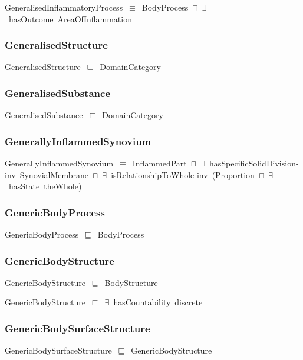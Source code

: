 \documentclass{article}
\begin{document}
GeneralisedInflammatoryProcess~\ensuremath{\equiv}~BodyProcess~\ensuremath{\sqcap}~\ensuremath{\exists}~hasOutcome~AreaOfInflammation

\subsubsection*{GeneralisedStructure}

GeneralisedStructure~\ensuremath{\sqsubseteq}~DomainCategory~

\subsubsection*{GeneralisedSubstance}

GeneralisedSubstance~\ensuremath{\sqsubseteq}~DomainCategory~

\subsubsection*{GenerallyInflammedSynovium}

GenerallyInflammedSynovium~\ensuremath{\equiv}~InflammedPart~\ensuremath{\sqcap}~\ensuremath{\exists}~hasSpecificSolidDivision-inv~SynovialMembrane~\ensuremath{\sqcap}~\ensuremath{\exists}~isRelationshipToWhole-inv~(Proportion~\ensuremath{\sqcap}~\ensuremath{\exists}~hasState~theWhole)

\subsubsection*{GenericBodyProcess}

GenericBodyProcess~\ensuremath{\sqsubseteq}~BodyProcess~

\subsubsection*{GenericBodyStructure}

GenericBodyStructure~\ensuremath{\sqsubseteq}~BodyStructure~

GenericBodyStructure~\ensuremath{\sqsubseteq}~\ensuremath{\exists}~hasCountability~discrete~

\subsubsection*{GenericBodySurfaceStructure}

GenericBodySurfaceStructure~\ensuremath{\sqsubseteq}~GenericBodyStructure~
\end{document}
